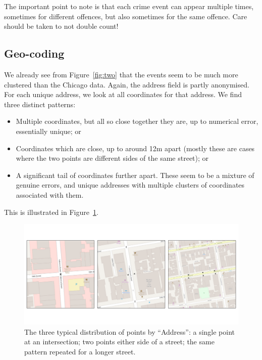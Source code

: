 \documentclass[twoside,a4paper,twocolumn,10pt]{article}
\theoremstyle{plain}
\theoremstyle{definition}
\begin{document}
The important point to note is that each crime event can appear multiple times, sometimes for
different offences, but also sometimes for the same offence.  Care should be taken to not double
count!


\subsection{Geo-coding}

We already see from Figure~\ref{fig:two} that the events seem to be much more clustered
than the Chicago data.  Again, the address field is partly anonymised.  For each unique
address, we look at all coordinates for that address.  We find three distinct patterns:
\begin{itemize}
\item Multiple coordinates, but all so close together they are, up to numerical error,
  essentially unique; or
\item Coordinates which are close, up to around 12m apart (mostly these are cases where the
  two points are different sides of the same street); or
\item A significant tail of coordinates further apart.  These seem to be a mixture of
  genuine errors, and unique addresses with multiple clusters of coordinates associated
  with them.
\end{itemize}
This is illustrated in Figure~\ref{fig:five}.

\begin{figure}
  \includegraphics[width=\textwidth]{sf_types.pdf}
  \caption{The three typical distribution of points by ``Address'': a single point at an
  intersection; two points either side of a street; the same pattern repeated for a longer
  street.}
  \label{fig:five}
\end{figure}
\end{document}

